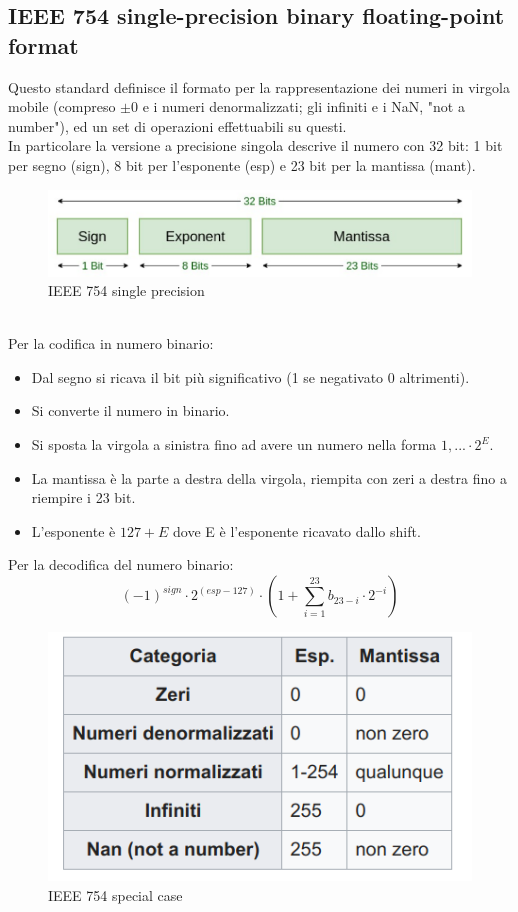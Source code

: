 \documentclass[]{IEEEtran}
\begin{document}
\subsection{IEEE 754 single-precision binary floating-point format}
Questo standard definisce il formato per la rappresentazione dei numeri in virgola mobile (compreso $\pm 0$ e i numeri denormalizzati; gli infiniti e i NaN, "not a number"), ed un set di operazioni effettuabili su questi. 
\\In particolare la versione a precisione singola descrive il numero con 32 bit: 1 bit per segno (sign), 8 bit per l'esponente (esp) e 23 bit per la mantissa (mant)\cite{IEE754}.
\begin{figure}[!htb]
    \centering
    \includegraphics[width=0.9\linewidth]{figures/ieee754_single_precision.png}
    \caption{IEEE 754 single precision}
    \label{fig:IEE754}
\end{figure}
\\Per la codifica in numero binario:
\begin{itemize}
    \item Dal segno si ricava il bit più significativo (1 se negativato 0 altrimenti).
    \item Si converte il numero in binario.
    \item Si sposta la virgola a sinistra fino ad avere un numero nella forma $1,... \cdot 2^{E}$.
    \item La mantissa è la parte a destra della virgola, riempita con zeri a destra fino a riempire i 23 bit.
    \item L'esponente è $127+E$ dove E è l'esponente ricavato dallo shift.
\end{itemize}
Per la decodifica del numero binario: $$(-1)^{sign}\cdot 2^{(esp-127)} \cdot (1 + \sum_{i=1}^{23}b_{23-i}\cdot 2^{-i})$$
\begin{figure}[!htb]
    \centering
    \includegraphics[width=0.6\linewidth]{figures/ieee754_special_case.png}
    \caption{IEEE 754 special case}
    \label{fig:IEEE_SPECIALCASE}
\end{figure}
\end{document}
